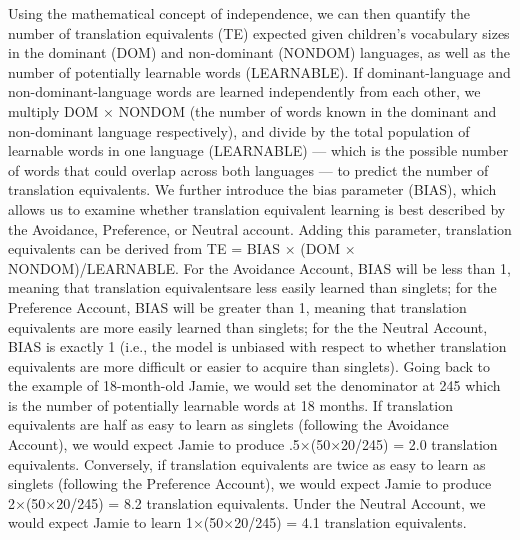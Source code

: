 \documentclass[
  english,
  ,man,floatsintext]{apa6}
\begin{document}
Using the mathematical concept of independence, we can then quantify the number of translation equivalents (TE) expected given children's vocabulary sizes in the dominant (DOM) and non-dominant (NONDOM) languages, as well as the number of potentially learnable words (LEARNABLE). If dominant-language and non-dominant-language words are learned independently from each other, we multiply DOM × NONDOM (the number of words known in the dominant and non-dominant language respectively), and divide by the total population of learnable words in one language (LEARNABLE) --- which is the possible number of words that could overlap across both languages --- to predict the number of translation equivalents. We further introduce the bias parameter (BIAS), which allows us to examine whether translation equivalent learning is best described by the Avoidance, Preference, or Neutral account. Adding this parameter, translation equivalents can be derived from TE = BIAS × (DOM × NONDOM)/LEARNABLE. For the Avoidance Account, BIAS will be less than 1, meaning that translation equivalentsare less easily learned than singlets; for the Preference Account, BIAS will be greater than 1, meaning that translation equivalents are more easily learned than singlets; for the the Neutral Account, BIAS is exactly 1 (i.e., the model is unbiased with respect to whether translation equivalents are more difficult or easier to acquire than singlets). Going back to the example of 18-month-old Jamie, we would set the denominator at 245 which is the number of potentially learnable words at 18 months. If translation equivalents are half as easy to learn as singlets (following the Avoidance Account), we would expect Jamie to produce .5×(50×20/245) = 2.0 translation equivalents. Conversely, if translation equivalents are twice as easy to learn as singlets (following the Preference Account), we would expect Jamie to produce 2×(50×20/245) = 8.2 translation equivalents. Under the Neutral Account, we would expect Jamie to learn 1×(50×20/245) = 4.1 translation equivalents.
\end{document}
